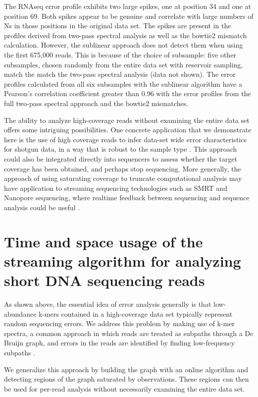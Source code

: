 The RNAseq error profile exhibits two large spikes, one at position 34 and one
at position 69.  Both spikes appear to be genuine and correlate with large
numbers of Ns in those positions in the original data set.  The spikes are
present in the profiles derived from two-pass spectral analysis as well as the
bowtie2 mismatch calculation.  However, the sublinear approach does not detect
them when using the first 675,000 reads.  This is because of the choice of
subsample: five other subsamples, chosen randomly from the entire data set with
reservoir sampling, match the match the two-pass spectral analysis (data not
shown).  The error profiles calculated from all six subsamples with the
sublinear algorithm have a Pearson's correlation coefficient greater than 0.96
with the error profiles from the full two-pass spectral approach and the
bowtie2 mismatches.


The ability to analyze high-coverage reads without examining the
entire data set offers some intriguing possibilities.  One concrete
application that we demonstrate here is the use of high coverage reads
to infer data-set wide error characteristics for shotgun data, in a
way that is robust to the sample type \cite{drisee}.  This approach
could also be integrated directly into sequencers to assess whether
the target coverage has been obtained, and perhaps stop sequencing.
More generally, the approach of using saturating coverage to truncate
computational analysis may have application to streaming sequencing
technologies such as SMRT and Nanopore sequencing, where realtime
feedback between sequencing and sequence analysis could be useful
\cite{pacbio,nanopore}.


\section{Time and space usage of the streaming algorithm for analyzing 
short DNA sequencing reads}

As shown above, the essential idea of error analysis generally is that low-abundance
k-mers contained in a high-coverage data set typically represent
random sequencing errors. We address this problem by making use of k-mer spectra, a common
approach in which reads are treated as subpaths through a De
Bruijn graph, and errors in the reads are identified by finding
low-frequency subpaths \cite{Pevzner2001}.  


We generalize this approach by
building the graph with an online algorithm and detecting regions of
the graph saturated by observations.  These regions can then be used
for per-read analysis without necessarily examining the entire data
set.


